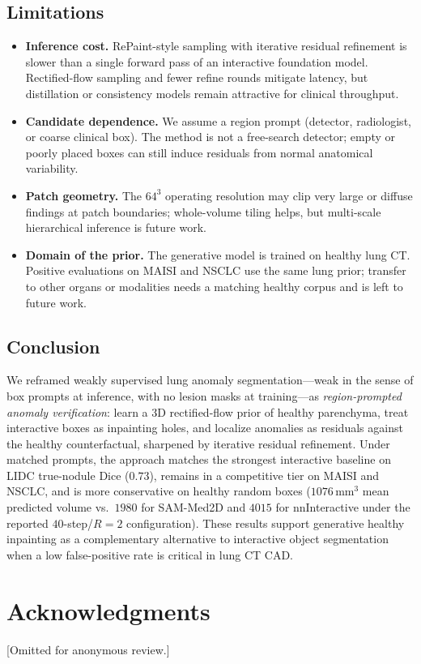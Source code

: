 \documentclass[letterpaper]{article} %
\begin{document}
\subsection{Limitations}
\begin{itemize}
    \item \textbf{Inference cost.} RePaint-style sampling with
    iterative residual refinement is slower than a single forward
    pass of an interactive foundation model. Rectified-flow
    sampling and fewer refine rounds mitigate latency, but
    distillation or consistency models remain attractive for
    clinical throughput.

    \item \textbf{Candidate dependence.} We assume a region prompt
    (detector, radiologist, or coarse clinical box). The method is
    not a free-search detector; empty or poorly placed boxes can
    still induce residuals from normal anatomical variability.

    \item \textbf{Patch geometry.} The $64^3$ operating resolution
    may clip very large or diffuse findings at patch boundaries;
    whole-volume tiling helps, but multi-scale hierarchical
    inference is future work.

    \item \textbf{Domain of the prior.} The generative model is
    trained on healthy lung CT. Positive evaluations on MAISI and
    NSCLC use the same lung prior; transfer to other organs or
    modalities needs a matching healthy corpus and is left to
    future work.
\end{itemize}

\subsection{Conclusion}
We reframed weakly supervised lung anomaly segmentation---weak in the
sense of box prompts at inference, with no lesion masks at training---as
\emph{region-prompted anomaly verification}: learn a 3D rectified-flow
prior of healthy parenchyma, treat interactive boxes as inpainting holes,
and localize anomalies as residuals against the healthy counterfactual,
sharpened by iterative residual refinement. Under matched prompts, the
approach matches the strongest interactive baseline on LIDC true-nodule
Dice (\(0.73\)), remains in a competitive tier on MAISI and NSCLC, and is
more conservative on healthy random boxes (\(1076\,\mathrm{mm}^3\) mean
predicted volume vs.\ \(1980\) for SAM-Med2D and \(4015\) for
nnInteractive under the reported \(40\)-step/\(R{=}2\) configuration).
These results support generative healthy inpainting as a complementary
alternative to interactive object segmentation when a low false-positive
rate is critical in lung CT CAD.

\section*{Acknowledgments}
[Omitted for anonymous review.]


\end{document}
